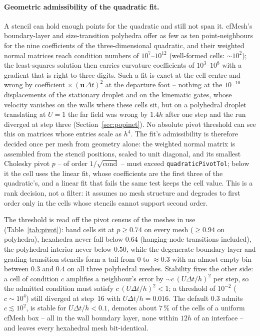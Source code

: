 \documentclass[preprint,3p,11pt]{elsarticle}
\begin{document}
\paragraph{Geometric admissibility of the quadratic fit.}
A stencil can hold enough points for the quadratic and still not span it. cfMesh's
boundary-layer and size-transition polyhedra offer as few as ten point-neighbours for the
nine coefficients of the three-dimensional quadratic, and their weighted normal matrices
reach condition numbers of $10^{7}$--$10^{12}$ (well-formed cells: $\sim10^{2}$); the
least-squares solution then carries curvature coefficients of $10^{3}$--$10^{8}$ with a
gradient that is right to three digits. Such a fit is exact at the cell centre and wrong by
coefficient$\,\times(\mathbf u\,\Delta t)^{2}$ at the departure foot -- nothing at the
$10^{-10}$ displacements of the stationary droplet and on the kinematic gates, whose
velocity vanishes on the walls where these cells sit, but on a polyhedral droplet
translating at $U=1$ the far field was wrong by $1.4h$ after one step and the run diverged
at step three (Section~\ref{sec:popinet}). No absolute pivot threshold can see this on
matrices whose entries scale as $h^{4}$. The fit's admissibility is therefore decided once
per mesh from geometry alone: the weighted normal matrix is assembled from the stencil
positions, scaled to unit diagonal, and its smallest Cholesky pivot $p$ -- of order
$1/\sqrt{\mathrm{cond}}$ -- must exceed \texttt{quadraticPivotTol}; below it the cell uses
the linear fit, whose coefficients are the first three of the quadratic's, and a linear fit
that fails the same test keeps the cell value. This is a rank decision, not a filter: it
assumes no mesh structure and degrades to first order only in the cells whose stencils
cannot support second order.

The threshold is read off the pivot census of the meshes in use (Table~\ref{tab:pivot}):
band cells sit at $p\ge0.74$ on every mesh ($\ge0.94$ on polyhedra), hexahedra never fall
below $0.64$ (hanging-node transitions included), the polyhedral interior never below
$0.50$, while the degenerate boundary-layer and grading-transition stencils form a tail
from $0$ to $\approx0.3$ with an almost empty bin between $0.3$ and $0.4$ on all three
polyhedral meshes. Stability fixes the other side: a cell of condition $c$ amplifies a
neighbour's error by $\sim c\,(U\Delta t/h)^{2}$ per step, so the admitted condition must
satisfy $c\,(U\Delta t/h)^{2}<1$; a threshold of $10^{-2}$ ($c\sim10^{4}$) still diverged
at step~16 with $U\Delta t/h=0.016$. The default $0.3$ admits $c\lesssim10^{2}$, is stable
for $U\Delta t/h<0.1$, demotes about $7\,\%$ of the cells of a uniform cfMesh box -- all in
the wall boundary layer, none within $12h$ of an interface -- and leaves every hexahedral
mesh bit-identical.
\end{document}
